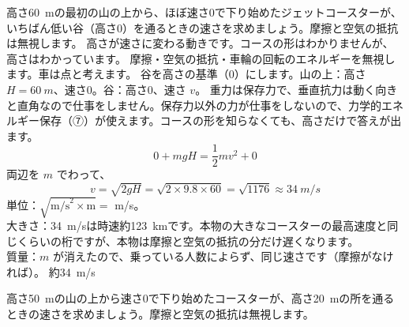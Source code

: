 \begin{kotoba}
\small
{}
\end{kotoba}

{}

\label{ph:力-4:ex1}
\begin{phreidai}[ジェットコースターの谷での速さ]
高さ\qty{60}{m}の最初の山の上から、ほぼ速さ0で下り始めたジェットコースターが、いちばん低い谷（高さ0）を通るときの速さを求めましょう。摩擦と空気の抵抗は無視します。
\phbamen
高さが速さに変わる動きです。コースの形はわかりませんが、高さはわかっています。
\phmushi
摩擦・空気の抵抗・車輪の回転のエネルギーを無視します。車は点と考えます。
\phzu
谷を高さの基準（0）にします。山の上：高さ $H=\qty{60}{m}$、速さ0。谷：高さ0、速さ $v$。
\phriyu
重力は保存力で、垂直抗力は動く向きと直角なので仕事をしません。保存力以外の力が仕事をしないので、力学的エネルギー保存（⑦）が使えます。コースの形を知らなくても、高さだけで答えが出ます。
\phtateru
\[0+mgH=\frac{1}{2}mv^2+0\]
\phtoku
両辺を $m$ でわって、
\[v=\sqrt{2gH}=\sqrt{2\times9.8\times60}=\sqrt{1176}\approx\qty{34}{m/s}\]
\phtashikame
単位：$\sqrt{\text{m/s}^2\times\text{m}}=$ m/s。\\
大きさ：\qty{34}{m/s}は時速約\qty{123}{km}です。本物の大きなコースターの最高速度と同じくらいの桁ですが、本物は摩擦と空気の抵抗の分だけ遅くなります。\\
質量：$m$ が消えたので、乗っている人数によらず、同じ速さです（摩擦がなければ）。
\kotae 約\qty{34}{m/s}
\end{phreidai}
\begin{jibun}
高さ\qty{50}{m}の山の上から速さ0で下り始めたコースターが、高さ\qty{20}{m}の所を通るときの速さを求めましょう。摩擦と空気の抵抗は無視します。
\end{jibun}

